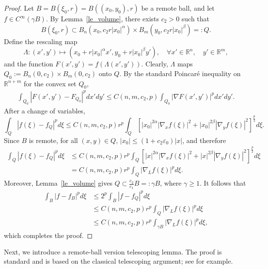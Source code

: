 \documentclass[12pt]{amsart}
\begin{document}
\begin{proof}
Let $B=B(\xi_0,r) = B((x_0,y_0),r)$ be a remote ball, and let $f\in C^\infty(\gamma B)$. By Lemma~\ref{le_volume}, there exists $c_2>0$ such that
\begin{equation*}
    B(\xi_0, r) \subset B_n(x_0,c_2 r |x_0|^\alpha) \times B_m(y_0,c_2 r |x_0|^\beta)=: Q.
\end{equation*}
Define the rescaling map
\begin{equation*}
    \Lambda: (x', y') \mapsto \left( x_0 + r|x_0|^\alpha x', y_0 + r|x_0|^\beta y' \right),\quad \forall x'\in \mathbb{R}^n,\quad y'\in \mathbb{R}^m,
\end{equation*}
and the function $F(x',y') = f\left( \Lambda(x',y') \right)$. Clearly, $\Lambda$ maps $Q_0:=B_n(0,c_2) \times B_m(0,c_2)$ onto $Q$. By the standard Poincar\'e inequality on $\mathbb{R}^{n+m}$ for the convex set $Q_0$,
\begin{align*}
    \int_{Q_0} |F(x',y') - F_{Q_0}|^p dx'dy' \le C(n,m,c_2,p) \int_{Q_0} |\nabla F(x',y')|^p dx'dy'.
\end{align*}
After a change of variables,
\begin{equation*}
    \int_{Q} |f(\xi) - f_{Q}|^p d\xi \le C(n,m,c_2,p) r^p \int_Q \left[|x_0|^{2\alpha} |\nabla_xf(\xi)|^2 + |x_0|^{2\beta} |\nabla_y f(\xi)|^2 \right]^{\frac{p}{2}} d\xi.
\end{equation*}
Since $B$ is remote, for all $(x,y)\in Q$, $|x_0|\le (1+c_2\varepsilon_0) |x|$, and therefore
\begin{align*}
    \int_{Q} |f(\xi) - f_{Q}|^p d\xi &\le C(n,m,c_2,p) r^p \int_Q \left[|x|^{2\alpha} |\nabla_xf(\xi)|^2 + |x|^{2\beta} |\nabla_y f(\xi)|^2 \right]^{\frac{p}{2}} d\xi \\
    &= C(n,m,c_2,p) r^p \int_Q |\nabla_L f(\xi)|^p d\xi.
\end{align*}
Moreover, Lemma~\ref{le_volume} gives $Q \subset \frac{c_2}{c_1} B=: \gamma B$, where $\gamma \ge 1$. It follows that
\begin{align*}
    \int_B |f-f_B|^p d\xi &\le 2^p \int_B |f-f_Q|^p d\xi \\
    &\le C(n,m,c_2,p) r^p \int_Q |\nabla_L f(\xi)|^p d\xi \\
    &\le C(n,m,c_2,p) r^p \int_{\gamma B} |\nabla_L f(\xi)|^p d\xi,
\end{align*}
which completes the proof.
\end{proof}



Next, we introduce a remote-ball version telescoping lemma. The proof is standard and is based on the classical telescoping argument; see \cite{HK} for example. 
\end{document}
